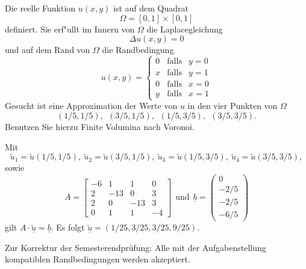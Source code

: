 Die reelle Funktion $u(x,y)$ ist auf dem Quadrat
\[
\Omega = [0, 1] \times [0,1]
\]
definiert. Sie erf"ullt im Innern von $\Omega$ die Laplacegleichung
\[
\Delta u(x,y) = 0
\]
und auf dem Rand von $\Omega$ die Randbedingung
\[
u(x,y) = \left\{
\begin{array}{ccl}
0 & \text{falls} & y = 0 \\
x & \text{falls} & y = 1 \\
0 & \text{falls} & x = 0 \\
y & \text{falls} & x = 1
\end{array} \right.
\]
Gesucht ist eine Approximation der Werte von $u$ in den vier Punkten
von $\Omega$
\[
(1/5,1/5), \ \  (3/5,1/5), \ \ (1/5,3/5), \ \  (3/5,3/5).
\]
Benutzen Sie hierzu Finite Volumina nach Voronoi.  

\begin{loesung}
Mit
\[
\tilde u_1 = \tilde u(1/5,1/5), \ 
\tilde u_2 = \tilde u(3/5,1/5), \ 
\tilde u_3 = \tilde u(1/5,3/5), \ 
\tilde u_4 = \tilde u(3/5,3/5),
\]
sowie
\[
A
=
\left[
\begin{array}{rrrr}
-6 & 1 & 1 & 0 \\
 2 & -13 & 0 & 3 \\
 2 & 0 & -13 & 3 \\
 0 & 1 & 1 & -4
\end{array}
\right]
\ \ \text{und} \ \
\underline{b}
=
\begin{pmatrix}
0 \\ -2/5 \\ -2/5 \\ -6/5
\end{pmatrix}
\]
\vspace{5mm}  
gilt $A \cdot \underline{\tilde u} = \underline{b}$.
Es folgt $\underline{\tilde u} = (1/25, 3/25, 3/25, 9/25).$

Zur Korrektur der Semesterendpr\"ufung: Alle mit der Aufgabenstellung
kompatiblen Randbedingungen werden akzeptiert.
\end{loesung}

